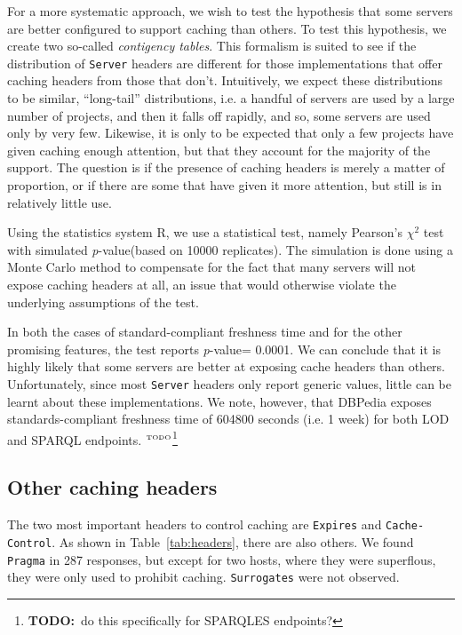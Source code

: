 \documentclass{llncs}
\newcommand{\pvalue}{\textit{p}-value}
\newcommand{\httph}[1]{\texttt{#1}}
\newcommand{\todo}[1]{\ensuremath{^{\textrm{\tiny{TODO}\normalsize}}}\footnote{\textbf{TODO:}~#1}}
\begin{document}
For a more systematic approach, we wish to test the hypothesis that
some servers are better configured to support caching than others. To
test this hypothesis, we create two so-called \emph{contigency
  tables}\cite{kn:bj}. This formalism is suited to see if the
distribution of  \httph{Server} headers are different for those implementations that
offer caching headers from those that don't. Intuitively, we expect
these distributions to be similar, ``long-tail'' distributions, i.e. a
handful of servers are used by a large number of projects, and then it
falls off rapidly, and so, some servers are used only by very
few. Likewise, it is only to be expected that only a few projects have
given caching enough attention, but that they account for the majority
of the support. The question is if the presence of caching headers is
merely a matter of proportion, or if there are some that have given it
more attention, but still is in relatively little use.

Using the statistics system R\cite{kn:r}, we use a statistical test,
namely Pearson's $\chi^2$ test with simulated \pvalue (based on 10000
replicates). The simulation is done using a Monte Carlo method to
compensate for the fact that many servers will not expose caching
headers at all, an issue that would otherwise violate the underlying
assumptions of the test.

In both the cases of standard-compliant freshness time and for the
other promising features, the test reports \pvalue = 0.0001. We can
conclude that it is highly likely that some servers are better at
exposing cache headers than others. Unfortunately, since most
\httph{Server} headers only report generic values, little can be
learnt about these implementations. We note, however, that DBPedia
exposes standards-compliant freshness time of 604800 seconds (i.e. 1
week) for both LOD and SPARQL endpoints. \todo{do this specifically
  for SPARQLES endpoints?}

\subsection{Other caching headers}

The two most important headers to control caching are \httph{Expires}
and \httph{Cache-Control}. As shown in Table~\ref{tab:headers}, there
are also others. We found \httph{Pragma} in 287 responses, but except
for two hosts, where they were superflous, they were only used to
prohibit caching. \httph{Surrogates} were not observed.
\end{document}
